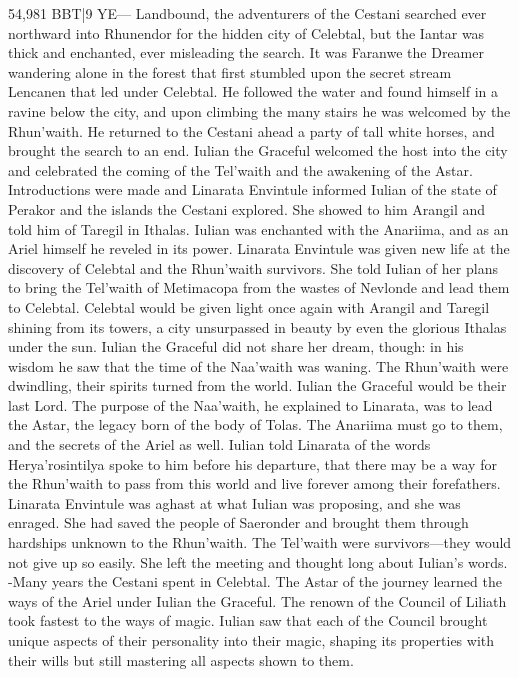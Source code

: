 \documentclass[smalldemyvopaper,11pt,twoside,onecolumn,openright,extrafontsizes]{memoir}
\begin{document}
54,981 BBT|9 YE— Landbound, the adventurers of the Cestani searched ever northward into Rhunendor for the hidden city of Celebtal, but the Iantar was thick and enchanted, ever misleading the search. It was Faranwe the Dreamer wandering alone in the forest that first stumbled upon the secret stream Lencanen that led under Celebtal. He followed the water and found himself in a ravine below the city, and upon climbing the many stairs he was welcomed by the Rhun’waith. He returned to the Cestani ahead a party of tall white horses, and brought the search to an end. Iulian the Graceful welcomed the host into the city and celebrated the coming of the Tel’waith and the awakening of the Astar. Introductions were made and Linarata Envintule informed Iulian of the state of Perakor and the islands the Cestani explored. She showed to him Arangil and told him of Taregil in Ithalas. Iulian was enchanted with the Anariima, and as an Ariel himself he reveled in its power. Linarata Envintule was given new life at the discovery of Celebtal and the Rhun’waith survivors. She told Iulian of her plans to bring the Tel’waith of Metimacopa from the wastes of Nevlonde and lead them to Celebtal. Celebtal would be given light once again with Arangil and Taregil shining from its towers, a city unsurpassed in beauty by even the glorious Ithalas under the sun. Iulian the Graceful did not share her dream, though: in his wisdom he saw that the time of the Naa’waith was waning. The Rhun’waith were dwindling, their spirits turned from the world. Iulian the Graceful would be their last Lord. The purpose of the Naa’waith, he explained to Linarata, was to lead the Astar, the legacy born of the body of Tolas. The Anariima must go to them, and the secrets of the Ariel as well. Iulian told Linarata of the words Herya’rosintilya spoke to him before his departure, that there may be a way for the Rhun’waith to pass from this world and live forever among their forefathers. Linarata Envintule was aghast at what Iulian was proposing, and she was enraged. She had saved the people of Saeronder and brought them through hardships unknown to the Rhun’waith. The Tel’waith were survivors—they would not give up so easily. She left the meeting and thought long about Iulian’s words.
-Many years the Cestani spent in Celebtal. The Astar of the journey learned the ways of the Ariel under Iulian the Graceful. The renown of the Council of Liliath took fastest to the ways of magic. Iulian saw that each of the Council brought unique aspects of their personality into their magic, shaping its properties with their wills but still mastering all aspects shown to them.
\end{document}
